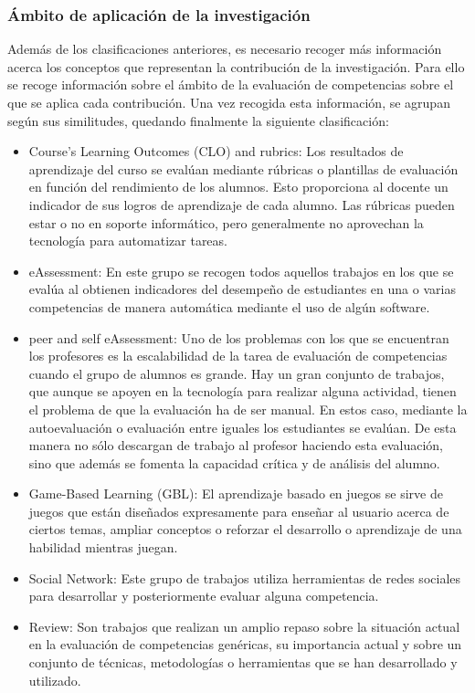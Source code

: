 \subsubsection{Ámbito de aplicación de la investigación}
Además de los clasificaciones anteriores, es necesario recoger más información acerca los conceptos que representan la contribución de la investigación. Para ello se recoge información sobre el ámbito de la evaluación de competencias sobre el que se aplica cada contribución. Una vez recogida esta información, se agrupan según sus similitudes, quedando finalmente la siguiente clasificación:
\begin{itemize}
\item Course’s Learning Outcomes (CLO) and rubrics: Los resultados de aprendizaje del curso se evalúan mediante rúbricas o plantillas de evaluación en función del rendimiento de los alumnos. Esto proporciona al docente un indicador de sus logros de aprendizaje de cada alumno. Las rúbricas pueden estar o no en soporte informático, pero generalmente no aprovechan la tecnología para automatizar tareas.
\item eAssessment: En este grupo se recogen todos aquellos trabajos en los que se evalúa al obtienen indicadores del desempeño de estudiantes en una o varias competencias de manera automática mediante el uso de algún software. 
\item peer and self eAssessment: Uno de los problemas con los que se encuentran los profesores es la escalabilidad de la tarea de evaluación de competencias cuando el grupo de alumnos es grande. Hay un gran conjunto de trabajos, que aunque se apoyen en la tecnología para realizar alguna actividad, tienen el problema de que la evaluación ha de ser manual. En estos caso, mediante la autoevaluación o evaluación entre iguales los estudiantes se evalúan. De esta manera no sólo descargan de trabajo al profesor haciendo esta evaluación, sino que además se fomenta la capacidad crítica y de análisis del alumno.
\item Game-Based Learning (GBL): El aprendizaje basado en juegos se sirve de juegos que están diseñados expresamente para enseñar al usuario acerca de ciertos temas, ampliar conceptos o reforzar el desarrollo o aprendizaje de una habilidad mientras juegan.
\item Social Network: Este grupo de trabajos utiliza herramientas de redes sociales para desarrollar y posteriormente evaluar alguna competencia.
\item Review: Son trabajos que realizan un amplio repaso sobre la situación actual en la evaluación de competencias genéricas, su importancia actual y sobre un conjunto de técnicas, metodologías o herramientas que se han desarrollado y utilizado.
\end{itemize}

